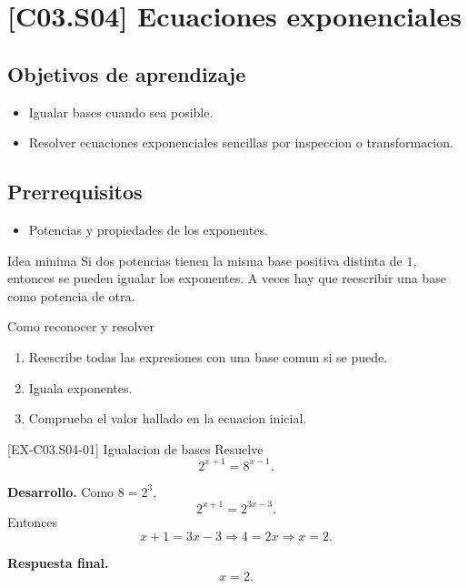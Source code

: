 \section{[C03.S04] Ecuaciones exponenciales}

\subsection*{Objetivos de aprendizaje}
\begin{itemize}
  \item Igualar bases cuando sea posible.
  \item Resolver ecuaciones exponenciales sencillas por inspeccion o transformacion.
\end{itemize}

\subsection*{Prerrequisitos}
\begin{itemize}
  \item Potencias y propiedades de los exponentes.
\end{itemize}

\begin{theorybox}{Idea minima}
Si dos potencias tienen la misma base positiva distinta de \(1\), entonces se pueden igualar
los exponentes. A veces hay que reescribir una base como potencia de otra.
\end{theorybox}

\begin{methodbox}{Como reconocer y resolver}
\begin{enumerate}
  \item Reescribe todas las expresiones con una base comun si se puede.
  \item Iguala exponentes.
  \item Comprueba el valor hallado en la ecuacion inicial.
\end{enumerate}
\end{methodbox}

\begin{solvedexample}{[EX-C03.S04-01] Igualacion de bases}
Resuelve
\[
2^{x+1}=8^{x-1}.
\]

\textbf{Desarrollo.} Como \(8=2^3\),
\[
2^{x+1}=2^{3x-3}.
\]
Entonces
\[
x+1=3x-3 \Longrightarrow 4=2x \Longrightarrow x=2.
\]

\textbf{Respuesta final.}
\[
x=2.
\]
\end{solvedexample}

